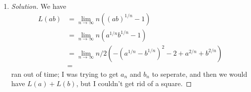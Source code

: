 \documentclass{article}
\begin{document}
\begin{enumerate}
\begin{proof}[Solution]
		Furthermore, it is bounded below, and monotonically decreasing
		(ran out of time, same as above).
		Thus the series converges.
	\end{proof}
	\item \begin{proof}[Solution]\let\qed\relax
			We have
			\begin{align*}
				L(ab)
				&= \lim_{n\to\infty} n((ab)^{1/n} - 1)\\
				&= \lim_{n\to\infty} n(a^{1/n}b^{1/n} - 1)\\
				&= \lim_{n\to\infty} n/2(-(a^{1/n} - b^{1/n})^2 - 2 + a^{2/n} + b^{2/n})\\
				&=
			\end{align*}
			ran out of time;
			I was trying to get $a_n$ and $b_n$ to seperate,
			and then we would have $L(a) + L(b)$,
			but I couldn't get rid of a square.
	\end{proof}
\end{enumerate}
\clearpage
~\clearpage
\end{document}
